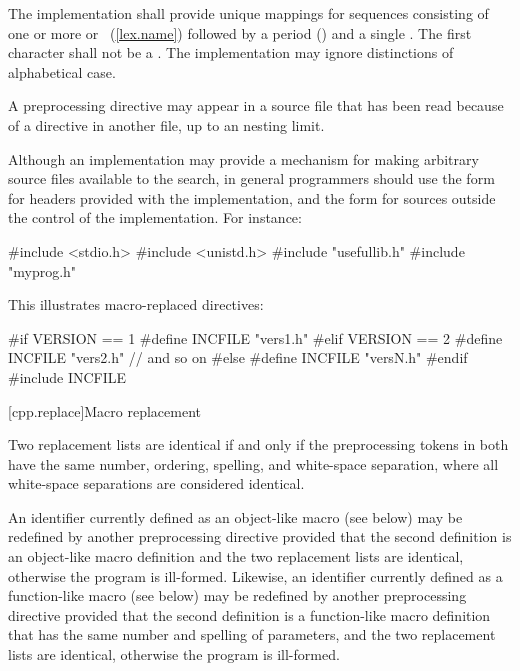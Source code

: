 \pnum
The implementation shall provide unique mappings for
sequences consisting of one or more
 or ~(\ref{lex.name})
followed by a period
()
and a single
.
The first character shall not be a .
The implementation may ignore distinctions of alphabetical case.

\pnum
A
preprocessing directive may appear
in a source file that has been read because of a
directive in another file,
up to an  nesting limit.

\pnum
\begin{note}
Although an implementation may provide a mechanism for making arbitrary
source files available to the \tcode{< >} search, in general
programmers should use the \tcode{< >} form for headers provided
with the implementation, and the  form for sources
outside the control of the implementation. For instance:

\begin{codeblock}
#include <stdio.h>
#include <unistd.h>
#include "usefullib.h"
#include "myprog.h"
\end{codeblock}

\end{note}

\pnum
\begin{example}
This illustrates macro-replaced
directives:

\begin{codeblock}
#if VERSION == 1
    #define INCFILE  "vers1.h"
#elif VERSION == 2
    #define INCFILE  "vers2.h"   // and so on
#else
    #define INCFILE  "versN.h"
#endif
#include INCFILE
\end{codeblock}
\end{example}

[cpp.replace]{Macro replacement}%
%
%

\pnum
{}%
Two replacement lists are identical if and only if
the preprocessing tokens in both have
the same number, ordering, spelling, and white-space separation,
where all white-space separations are considered identical.

\pnum
An identifier currently defined as an
%
%
object-like macro (see below) may be redefined by another
preprocessing directive provided that the second definition is an
object-like macro definition and the two replacement lists
are identical, otherwise the program is ill-formed.
Likewise, an identifier currently defined as a
%
%
function-like macro (see below) may be redefined by another
preprocessing directive provided that the second definition is a
function-like macro definition that has the same number and spelling
of parameters,
and the two replacement lists are identical,
otherwise the program is ill-formed.

